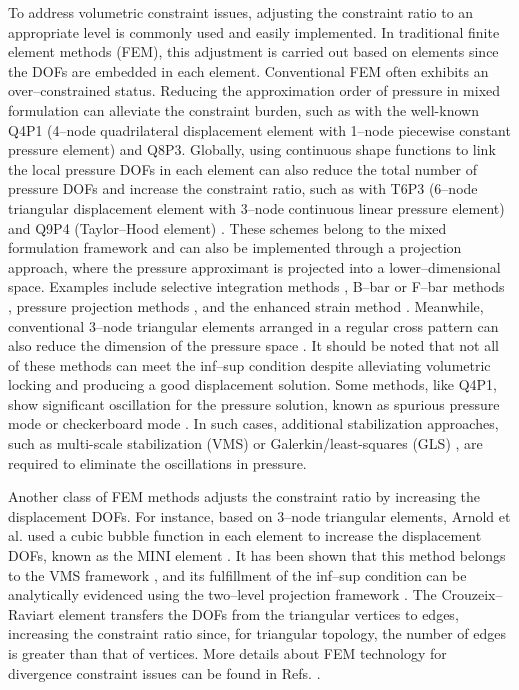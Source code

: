 To address volumetric constraint issues, adjusting the constraint ratio to an appropriate level is commonly used and easily implemented.
In traditional finite element methods (FEM), this adjustment is carried out based on elements since the DOFs are embedded in each element.
Conventional FEM often exhibits an over--constrained status.
Reducing the approximation order of pressure in mixed formulation can alleviate the constraint burden, such as with the well-known Q4P1 (4--node quadrilateral displacement element with 1--node piecewise constant pressure element) and Q8P3.
Globally, using continuous shape functions to link the local pressure DOFs in each element can also reduce the total number of pressure DOFs and increase the constraint ratio, such as with T6P3 (6--node triangular displacement element with 3--node continuous linear pressure element) and Q9P4 (Taylor--Hood element) \cite{hood1974}.
These schemes belong to the mixed formulation framework and can also be implemented through a projection approach, where the pressure approximant is projected into a lower--dimensional space.
Examples include selective integration methods \cite{malkus1978,shilt2020}, B--bar or F--bar methods \cite{simo1990,broccardo2009,coombs2018,saloustros2021,rodriguez2023}, pressure projection methods \cite{simo1985,dohrmann2004}, and the enhanced strain method \cite{lovadina2003}.
Meanwhile, conventional 3--node triangular elements arranged in a regular cross pattern can also reduce the dimension of the pressure space \cite{bathe2001}.
It should be noted that not all of these methods can meet the inf--sup condition despite alleviating volumetric locking and producing a good displacement solution.
Some methods, like Q4P1, show significant oscillation for the pressure solution, known as spurious pressure mode or checkerboard mode \cite{bathe2001}.
In such cases, additional stabilization approaches, such as multi-scale stabilization (VMS) \cite{hughes1995,masud2005,rossi2021,karabelas2022} or Galerkin/least-squares (GLS) \cite{hughes1986}, are required to eliminate the oscillations in pressure.

Another class of FEM methods adjusts the constraint ratio by increasing the displacement DOFs.
For instance, based on 3--node triangular elements, Arnold et al. used a cubic bubble function in each element to increase the displacement DOFs, known as the MINI element \cite{arnold1984,auricchio2005}.
It has been shown that this method belongs to the VMS framework \cite{quarteroni1994}, and its fulfillment of the inf--sup condition can be analytically evidenced using the two--level projection framework \cite{brezzi}.
The Crouzeix--Raviart element \cite{crouzeix1973} transfers the DOFs from the triangular vertices to edges, increasing the constraint ratio since, for triangular topology, the number of edges is greater than that of vertices.
More details about FEM technology for divergence constraint issues can be found in Refs. \cite{hughes2000,bathe1996,brink1996}.

